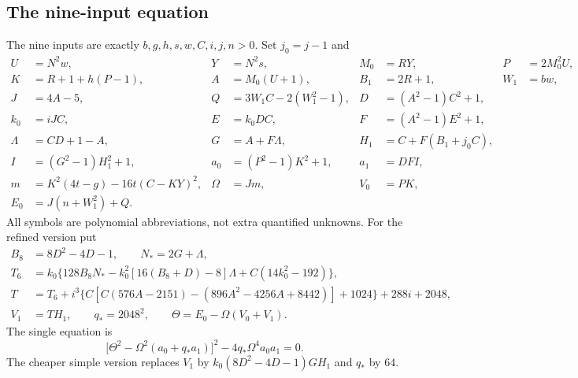 \subsection{The nine-input equation}
The nine inputs are exactly $b,g,h,s,w,C,i,j,n>0$.  Set $j_0=j-1$ and
{\small
\begin{align*}
 U&=N^2w,&Y&=N^2s,&M_0&=RY,&P&=2M_0^2U,\\
 K&=R+1+h(P-1),&A&=M_0(U+1),&B_1&=2R+1,&W_1&=bw,\\
 J&=4A-5,&Q&=3W_1C-2(W_1^2-1),&D&=(A^2-1)C^2+1,\\
 k_0&=iJC,&E&=k_0DC,&F&=(A^2-1)E^2+1,\\
 \Lambda&=CD+1-A,&G&=A+F\Lambda,&H_1&=C+F(B_1+j_0C),\\
 I&=(G^2-1)H_1^2+1,&a_0&=(P^2-1)K^2+1,&a_1&=DFI,\\
 m&=K^2(4t-g)-16t(C-KY)^2,&\Omega&=Jm,&V_0&=PK,\\
 E_0&=J(n+W_1^2)+Q.&&&&
\end{align*}
}
All symbols are polynomial abbreviations, not extra quantified unknowns.
For the refined version put
{\small
\begin{align*}
 B_8&=8D^2-4D-1,\qquad N_* =2G+\Lambda,\\
 T_6&=k_0\{128B_8N_*-k_0^2[16(B_8+D)-8]\Lambda
                       +C(14k_0^2-192)\},\\
 T&=T_6+i^3\{C[C(576A-2151)-(896A^2-4256A+8442)]+1024\}
          +288i+2048,\\
 V_1&=TH_1,\qquad q_*=2048^2,\qquad
 \Theta=E_0-\Omega(V_0+V_1).
\end{align*}
}
The single equation is
\begin{equation}
 \boxed{\bigl[\Theta^2-\Omega^2(a_0+q_*a_1)\bigr]^2
             -4q_*\Omega^4a_0a_1=0.}
 \label{eq:round9-refined-nine}
\end{equation}
The cheaper simple version replaces $V_1$ by
$k_0(8D^2-4D-1)GH_1$ and $q_*$ by $64$.

